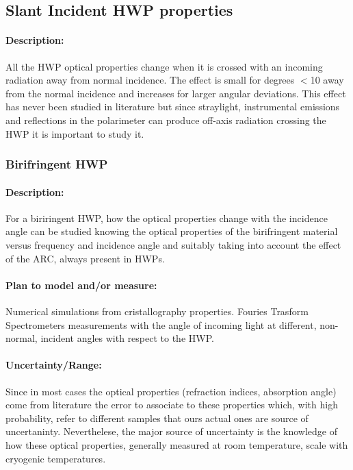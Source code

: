 \subsection{Slant Incident HWP properties}

\paragraph{Description:}
All the HWP optical properties change when it is crossed with an incoming radiation away from normal incidence.
The effect is small for degrees $<$10 away from the normal incidence and increases for larger angular deviations.
This effect has never been studied in literature but since straylight, instrumental emissions and reflections in the polarimeter 
can produce off-axis radiation crossing the HWP it is important to study it.


\subsubsection{Birifringent HWP}
\paragraph{Description:}
For a biriringent HWP, how the optical properties change with the incidence angle can be studied knowing the optical properties of the 
birifringent material versus frequency and incidence angle and suitably taking into account the effect of the ARC, always present in HWPs.


\paragraph{Plan to model and/or measure:}
Numerical simulations from cristallography properties.
Fouries Trasform Spectrometers measurements with the angle of incoming light at different, 
non-normal, incident angles with respect to the HWP.


\paragraph{Uncertainty/Range:}
Since in most cases the optical properties (refraction indices, absorption angle) come from literature
the error to associate to these properties which, with high probability, refer to different samples that ours actual ones
are source of uncertaninty. Neverthelese, the major source of uncertainty is the knowledge of how these optical properties,
generally measured at room temperature, scale with cryogenic temperatures.


